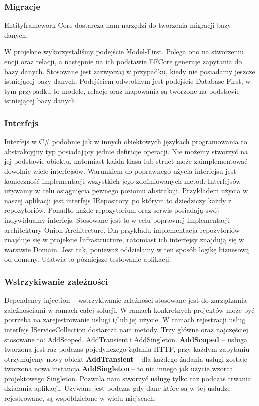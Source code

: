 \documentclass[a4paper,twoside,12pt]{book}
\begin{document}
\subsubsection{Migracje}
Entityframework Core dostarcza nam narzędzi do tworzenia migracji bazy danych.  

W projekcie wykorzystaliśmy podejście Model-First. Polega ono na stworzeniu encji oraz relacji, a następnie na ich podstawie EFCore generuje zapytania do bazy danych. Stosowane jest zazwyczaj w przypadku, kiedy nie posiadamy jeszcze istniejącej bazy danych. Podejściem odwrotnym jest podejście Database-First, w tym przypadku to modele, relacje oraz mapowania są tworzone na podstawie istniejącej bazy danych. 

\subsubsection{Interfejs}
Interfejs w C\# podobnie jak w innych obiektowych językach programowania to abstrakcyjny typ posiadający jednie definicje operacji. Nie możemy stworzyć na jej podstawie obiektu, natomiast każda klasa lub struct może zaimplementować dowolnie wiele interfejsów. Warunkiem do poprawnego użycia interfejsu jest konieczność implementacji wszystkich jego zdefiniowanych metod. Interfejsów używamy w celu osiągnięcia pewnego poziomu abstrakcji. Przykładem użycia w naszej aplikacji jest interfejs IRepository, po którym to dziedziczy każdy z repozytoriów. Ponadto każde repozytorium oraz serwis posiadają swój indywidualny interfejs. Stosowane jest to w celu poprawnej implementacji architektury Onion Architecture. Dla przykładu implementacja repozytoriów znajduje się w projekcie Infrastructure, natomiast ich interfejsy znajdują się w warstwie Domain. Jest tak, ponieważ oddzielamy w ten sposób logikę biznesową od domeny. Ułatwia to późniejsze testowanie aplikacji. 

\subsubsection{Wstrzykiwanie zależności}
Dependency injection – wstrzykiwanie zależności stosowane jest do zarządzania zależnościami w ramach całej solucji. W ramach konkretnych projektów może być potrzeba na zarejestrowanie usługi i/lub jej użycie. W ramach rejestracji usług interfejs IServiceCollection dostarcza nam metody. Trzy główne oraz najczęściej stosowane to: AddScoped, AddTransient i AddSingleton. 
\textbf{AddScoped} -- usługa tworzona jest raz podczas pojedynczego żądania HTTP, przy każdym zapytaniu otrzymujemy nowy obiekt 
\textbf{AddTransient} -- dla każdego żądania usługi zostaje tworzona nowa instancja 
\textbf{AddSingleton} -- to nic innego jak użycie wzorca projektowego Singleton. Pozwala nam stworzyć usługę tylko raz podczas trwania działania aplikacji. Używane jest podczas gdy dane które są w tej usłudze rejestrowane, są współdzielone w wielu miejscach. 
\end{document}
